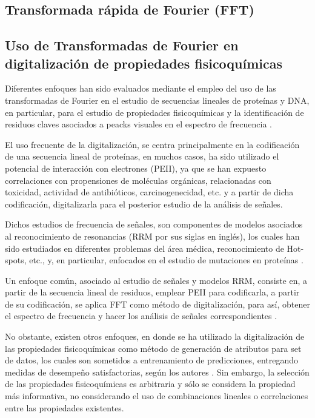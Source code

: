 \subsection{Transformada rápida de Fourier (FFT)}


\subsection{Uso de Transformadas de Fourier en digitalización de propiedades fisicoquímicas}

Diferentes enfoques han sido evaluados mediante el empleo del uso de las transformadas de Fourier en el estudio de secuencias lineales de proteínas y DNA, en particular, para el estudio de propiedades fisicoquímicas y la identificación de residuos claves asociados a peacks visuales en el espectro de frecuencia \cite{veljkovic1985possible, cosic1987prediction}. 

El uso frecuente de la digitalización, se centra principalmente en la codificación de una secuencia lineal de proteínas, en muchos casos, ha sido utilizado el potencial de interacción con electrones (PEII), ya que se han expuesto correlaciones con propensiones de moléculas orgánicas, relacionadas con toxicidad, actividad de antibióticos, carcinogenecidad, etc. \cite{veljkovic1985possible, cosic1994macromolecular, cosic1987prediction} y a partir de dicha codificación, digitalizarla para el posterior estudio de la análisis de señales.

Dichos estudios de frecuencia de señales, son componentes de modelos asociados al reconocimiento de resonancias (RRM por sus siglas en inglés), los cuales han sido estudiados en diferentes problemas del área médica, reconocimiento de Hot-spots, etc., y, en particular, enfocados en el estudio de mutaciones en proteínas \cite{cosic1994macromolecular, cosic2016analysis, cosic1987prediction}. 

Un enfoque común, asociado al estudio de señales y modelos RRM, consiste en, a partir de la secuencia lineal de residuos, emplear PEII para codificarla, a partir de su codificación, se aplica FFT como método de digitalización, para así, obtener el espectro de frecuencia y hacer los análisis de señales correspondientes \cite{veljkovic1985possible, cosic1994macromolecular, cosic2016analysis, cosic1987prediction}.

No obstante, existen otros enfoques, en donde se ha utilizado la digitalización de las propiedades fisicoquímicas como método de generación de atributos para set de datos, los cuales son sometidos a entrenamiento de predicciones, entregando medidas de desempeño satisfactorias, según los autores \cite{cadet2018application}. Sin embargo, la selección de las propiedades fisicoquímicas es arbitraria y sólo se considera la propiedad más informativa, no considerando el uso de combinaciones lineales o correlaciones entre las propiedades existentes.

